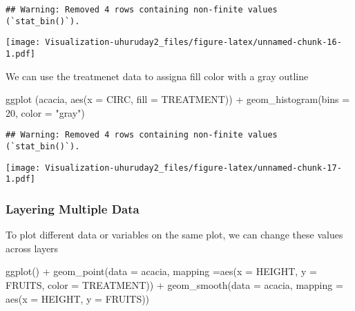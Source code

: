 \documentclass[
]{article}
\newenvironment{Shaded}{\begin{snugshade}}{\end{snugshade}}
\newcommand{\AttributeTok}[1]{\textcolor[rgb]{0.77,0.63,0.00}{#1}}
\newcommand{\DecValTok}[1]{\textcolor[rgb]{0.00,0.00,0.81}{#1}}
\newcommand{\FunctionTok}[1]{\textcolor[rgb]{0.00,0.00,0.00}{#1}}
\newcommand{\NormalTok}[1]{#1}
\newcommand{\SpecialCharTok}[1]{\textcolor[rgb]{0.00,0.00,0.00}{#1}}
\newcommand{\StringTok}[1]{\textcolor[rgb]{0.31,0.60,0.02}{#1}}
\begin{document}
\begin{verbatim}
## Warning: Removed 4 rows containing non-finite values (`stat_bin()`).
\end{verbatim}

\texttt{[image: Visualization-uhuruday2\_files/figure-latex/unnamed-chunk-16-1.pdf]}

We can use the treatmenet data to assigna fill color with a gray outline

\begin{Shaded}
\begin{Highlighting}[]
\FunctionTok{ggplot}\NormalTok{ (acacia, }\FunctionTok{aes}\NormalTok{(}\AttributeTok{x =}\NormalTok{ CIRC, }\AttributeTok{fill =}\NormalTok{ TREATMENT)) }\SpecialCharTok{+}
  \FunctionTok{geom\_histogram}\NormalTok{(}\AttributeTok{bins =} \DecValTok{20}\NormalTok{, }\AttributeTok{color =} \StringTok{"gray"}\NormalTok{)}
\end{Highlighting}
\end{Shaded}

\begin{verbatim}
## Warning: Removed 4 rows containing non-finite values (`stat_bin()`).
\end{verbatim}

\texttt{[image: Visualization-uhuruday2\_files/figure-latex/unnamed-chunk-17-1.pdf]}

\hypertarget{layering-multiple-data}{%
\subsubsection{Layering Multiple Data}\label{layering-multiple-data}}

To plot different data or variables on the same plot, we can change
these values across layers

\begin{Shaded}
\begin{Highlighting}[]
\FunctionTok{ggplot}\NormalTok{() }\SpecialCharTok{+} 
  \FunctionTok{geom\_point}\NormalTok{(}\AttributeTok{data =}\NormalTok{ acacia,}
             \AttributeTok{mapping =}\FunctionTok{aes}\NormalTok{(}\AttributeTok{x =}\NormalTok{ HEIGHT, }\AttributeTok{y =}\NormalTok{ FRUITS,}
                          \AttributeTok{color =}\NormalTok{ TREATMENT)) }\SpecialCharTok{+}
  \FunctionTok{geom\_smooth}\NormalTok{(}\AttributeTok{data =}\NormalTok{ acacia,}
              \AttributeTok{mapping =} \FunctionTok{aes}\NormalTok{(}\AttributeTok{x =}\NormalTok{ HEIGHT, }\AttributeTok{y =}\NormalTok{ FRUITS))}
\end{Highlighting}
\end{Shaded}
\end{document}
